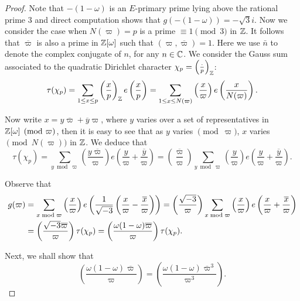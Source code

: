 \documentclass[twoside,leqno,10pt, A4]{amsart}
\begin{document}
\begin{proof}
   Note that $-(1-\omega)$ is an $E$-primary prime lying above the rational prime $3$ and direct computation shows that $g(-(1-\omega))=-\sqrt{3}i$. Now we consider the case when $N(\varpi)=p$ is a prime $\equiv 1 \pmod 3$ in $\mathbb Z$.  It follows that $\overline{\varpi}$ is also a prime in $\mathbb Z[\omega]$ such that $(\varpi, \overline{\varpi}) = 1$.  Here we use $\bar{n}$ to denote the
complex conjugate of $n$, for any $n \in \mathbb C$. We consider the Gauss sum associated to the quadratic Dirichlet character $\chi_p=\left(\frac{\cdot}{p}\right)_{\mathbb Z}$:
\begin{equation*}
 \tau(\chi_p) =  \sum_{1 \leq x \leq p} \left(\frac{x}{p}\right)_{\mathbb Z} e \left( \frac{x}{p} \right) =  \sum_{1 \leq x \leq N(\varpi)} \left(\frac{x}{\varpi}\right) e \left( \frac{x}{N(\varpi)} \right).
\end{equation*}

  Now write $x = y \overline{\varpi} + \overline{y} \varpi$, where $y$ varies over a set
of representatives in $\mathbb Z[\omega] \pmod{\varpi}$, then it is easy to see that as $y$ varies
$\pmod{\varpi}$, $x$ varies $\pmod{N(\varpi)}$ in $\mathbb Z$.  We deduce that
\begin{equation*}
  \tau(\chi_p) =  \sum_{y \bmod{\varpi}} \left(\frac{y \overline{\varpi}}{\varpi}\right) e \left( \frac{y}{\varpi} +\overline{\frac {y}{\varpi} } \right)  =
 \left(\frac{\overline{\varpi}}{\varpi}\right)\sum_{y \bmod{\varpi}} \left(\frac{y}{\varpi}\right) e \left( \frac{y}{\varpi} +\overline{\frac {y}{\varpi} } \right).
\end{equation*}

Observe that
\begin{equation*}
\begin{split}
  g(\varpi) & =  \sum_{x \bmod{\varpi}} \left(\frac{x}{\varpi}\right) e \left( \frac{1}{\sqrt{-3}}  \left( \frac {x}{\varpi} - \frac{\overline{x}}{\varpi} \right) \right)= \left(\frac{\sqrt{-3}}{\varpi}\right)\sum_{x \bmod{\varpi}} \left(\frac{x}{\varpi}\right) e \left( \frac {x}{\varpi } + \frac {\overline{x}}{\varpi} \right)\\
  & =\left(\frac{\sqrt{-3}\overline{\varpi}}{\varpi}\right)\tau(\chi_p)=\left(\frac{\omega(1-\omega)\overline{\varpi}}{\varpi}\right)\tau(\chi_p).
  \end{split}
\end{equation*}

Next, we shall show that
\begin{equation*}
    \left(\frac{\omega(1-\omega)\overline{\varpi}}{\varpi}\right)=\left(\frac{\omega(1-\omega)\overline{\varpi}^3}{\varpi^3}\right).
\end{equation*}


\end{proof}
\end{document}
